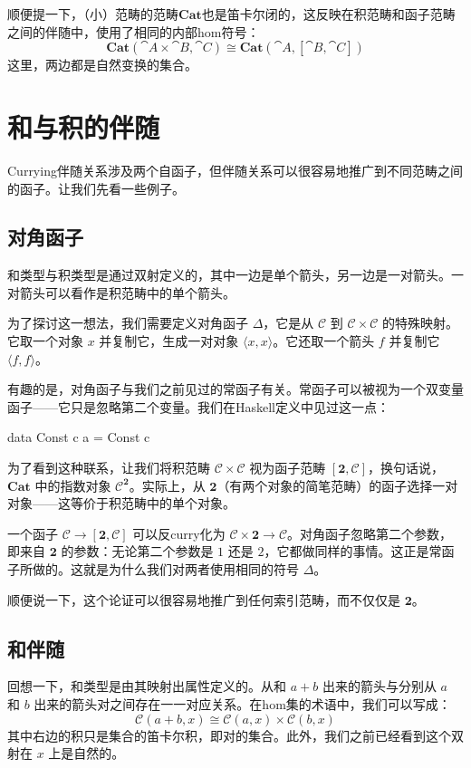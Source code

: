 \documentclass[DaoFP]{subfiles}
\begin{document}
顺便提一下，（小）范畴的范畴$\mathbf{Cat}$也是笛卡尔闭的，这反映在积范畴和函子范畴之间的伴随中，使用了相同的内部hom符号：
\[ \mathbf{Cat} (\cat A \times \cat B, \cat C) \cong \mathbf{Cat} (\cat A, [\cat B, \cat C]) \]
这里，两边都是自然变换的集合。

\section{和与积的伴随}

Currying伴随关系涉及两个自函子，但伴随关系可以很容易地推广到不同范畴之间的函子。让我们先看一些例子。

\subsection{对角函子}

和类型与积类型是通过双射定义的，其中一边是单个箭头，另一边是一对箭头。一对箭头可以看作是积范畴中的单个箭头。

为了探讨这一想法，我们需要定义对角函子 $\Delta$，它是从 $\mathcal{C}$ 到 $\mathcal{C} \times \mathcal{C}$ 的特殊映射。它取一个对象 $x$ 并复制它，生成一对对象 $\langle x, x \rangle$。它还取一个箭头 $f$ 并复制它 $\langle f, f \rangle$。

有趣的是，对角函子与我们之前见过的常函子有关。常函子可以被视为一个双变量函子——它只是忽略第二个变量。我们在Haskell定义中见过这一点：
\begin{haskell}
data Const c a = Const c
\end{haskell}

为了看到这种联系，让我们将积范畴 $\mathcal{C} \times \mathcal{C}$ 视为函子范畴 $[ \mathbf{2}, \mathcal{C}]$，换句话说，$\mathbf{Cat}$ 中的指数对象 $\mathcal{C}^{ \mathbf{2}}$。实际上，从 $\mathbf{2}$（有两个对象的简笔范畴）的函子选择一对对象——这等价于积范畴中的单个对象。

一个函子 $\mathcal{C} \to [\mathbf{2}, \mathcal{C}]$ 可以反curry化为 $\mathcal{C} \times \mathbf{2} \to  \mathcal{C}$。对角函子忽略第二个参数，即来自 $\mathbf{2}$ 的参数：无论第二个参数是 $1$ 还是 $2$，它都做同样的事情。这正是常函子所做的。这就是为什么我们对两者使用相同的符号 $\Delta$。

顺便说一下，这个论证可以很容易地推广到任何索引范畴，而不仅仅是 $\mathbf{2}$。

\subsection{和伴随}

回想一下，和类型是由其映射出属性定义的。从和 $a + b$ 出来的箭头与分别从 $a$ 和 $b$ 出来的箭头对之间存在一一对应关系。在hom集的术语中，我们可以写成：
\[  \mathcal{C} (a + b, x) \cong \mathcal{C}( a , x) \times \mathcal{C}( b , x)\]
其中右边的积只是集合的笛卡尔积，即对的集合。此外，我们之前已经看到这个双射在 $x$ 上是自然的。
\end{document}

